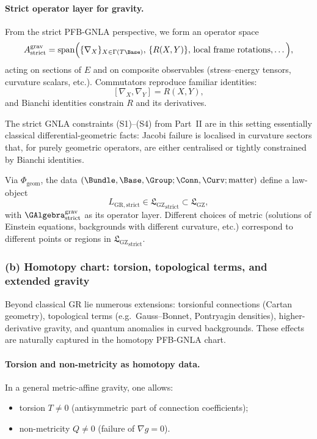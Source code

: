 \documentclass[11pt]{book}
\theoremstyle{plain}
\theoremstyle{definition}
\newcommand{\GZLS}{\ensuremath{\mathfrak{L}_{\mathrm{GZ}}}}       \newcommand{\GZLT}{\ensuremath{M_{!w}}}                           \newcommand{\GZLOC}{\ensuremath{A_M}}                             \newcommand{\GZLCurv}{\ensuremath{\mathcal{F}_{\mathrm{law}}}}
\begin{document}
\paragraph{Strict operator layer for gravity.}

From the strict PFB-GNLA perspective, we form an operator space
\[
  A_{\mathrm{strict}}^{\mathrm{grav}}
  =
  \mathrm{span}\Bigl(
    \{\nabla_X\}_{X\in\Gamma(T\Base)},\,
    \{R(X,Y)\},\,
    \text{local frame rotations},\dots
  \Bigr),
\]
acting on sections of $E$ and on composite observables (stress--energy
tensors, curvature scalars, etc.). Commutators reproduce familiar
identities:
\[
  [\nabla_X,\nabla_Y]
  =
  R(X,Y),
\]
and Bianchi identities constrain $R$ and its derivatives.

The strict GNLA constraints (S1)--(S4) from Part~II are in this setting
essentially classical differential-geometric facts: Jacobi failure is
localised in curvature sectors that, for purely geometric operators,
are either centralised or tightly constrained by Bianchi identities.

Via $\Phi_{\mathrm{geom}}$, the data
$(\Bundle,\Base,\Group;\Conn,\Curv;\text{matter})$ define a law-object
\[
  L_{\mathrm{GR,strict}}
  \in {\GZLS}_{\mathrm{strict}}\subset\GZLS,
\]
with $\GAlgebra_{\mathrm{strict}}^{\mathrm{grav}}$ as its operator
layer. Different choices of metric (solutions of Einstein equations,
backgrounds with different curvature, etc.) correspond to different
points or regions in ${\GZLS}_{\mathrm{strict}}$.



\subsubsection*{(b) Homotopy chart: torsion, topological terms, and extended gravity}

Beyond classical GR lie numerous extensions: torsionful connections
(Cartan geometry), topological terms (e.g.\ Gauss--Bonnet, Pontryagin
densities), higher-derivative gravity, and quantum anomalies in
curved backgrounds. These effects are naturally captured in the
homotopy PFB-GNLA chart.

\paragraph{Torsion and non-metricity as homotopy data.}

In a general metric-affine gravity, one allows:

\begin{itemize}
  \item torsion $T\neq0$ (antisymmetric part of connection coefficients);
  \item non-metricity $Q\neq0$ (failure of $\nabla g=0$).
\end{itemize}
\end{document}
